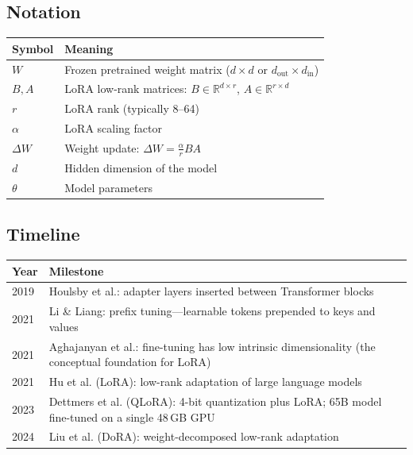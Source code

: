 \subsection*{Notation}

\begin{center}
\begin{tabular}{ll}
\toprule
Symbol & Meaning \\
\midrule
$W$ & Frozen pretrained weight matrix ($d \times d$ or $d_{\text{out}} \times d_{\text{in}}$) \\
$B, A$ & LoRA low-rank matrices: $B \in \mathbb{R}^{d \times r}$, $A \in \mathbb{R}^{r \times d}$ \\
$r$ & LoRA rank (typically 8--64) \\
$\alpha$ & LoRA scaling factor \\
$\Delta W$ & Weight update: $\Delta W = \frac{\alpha}{r} B A$ \\
$d$ & Hidden dimension of the model \\
$\theta$ & Model parameters \\
\bottomrule
\end{tabular}
\end{center}


\subsection*{Timeline}

\begin{center}
\begin{tabularx}{\textwidth}{@{}lX@{}}
\toprule
\textbf{Year} & \textbf{Milestone} \\
\midrule
2019 & Houlsby et al.: adapter layers inserted between Transformer blocks \\
2021 & Li \& Liang: prefix tuning---learnable tokens prepended to keys and values \\
2021 & Aghajanyan et al.: fine-tuning has low intrinsic dimensionality (the conceptual foundation for LoRA) \\
2021 & Hu et al. (LoRA): low-rank adaptation of large language models \\
2023 & Dettmers et al. (QLoRA): 4-bit quantization plus LoRA; 65B model fine-tuned on a single 48\,GB GPU \\
2024 & Liu et al. (DoRA): weight-decomposed low-rank adaptation \\
\bottomrule
\end{tabularx}
\end{center}


